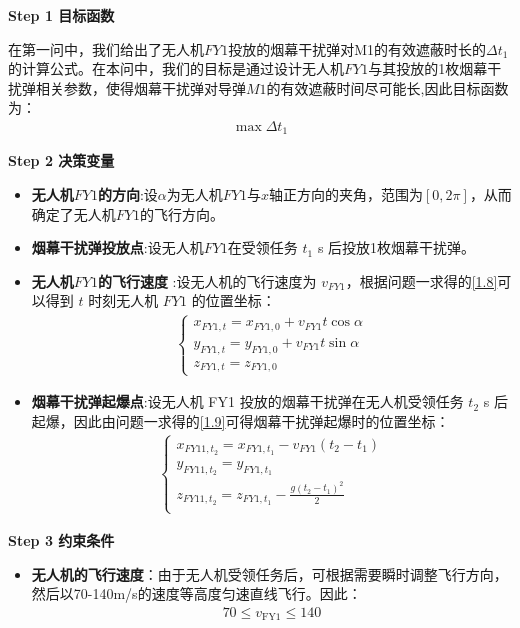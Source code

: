 \documentclass[../main.tex]{subfiles}
\begin{document}
\noindent \textbf{Step 1 目标函数}
\par 在第一问中，我们给出了无人机$FY1$投放的烟幕干扰弹对M1的有效遮蔽时长的$\Delta t_1$ 的计算公式。在本问中，我们的目标是通过设计无人机$FY1$与其投放的1枚烟幕干扰弹相关参数，使得烟幕干扰弹对导弹$M1$的有效遮蔽时间尽可能长,因此目标函数为：
\begin{align}\label{10.1}
  \max \Delta t_1
\end{align}



\noindent \textbf{Step 2 决策变量}

\begin{itemize}
\item \textbf{无人机$FY1$的方向}:设$\alpha $为无人机$FY1$与$x$轴正方向的夹角，范围为$\left[ 0,2\pi \right] $，从而确定了无人机$FY1$的飞行方向。
\item \textbf{烟幕干扰弹投放点}:设无人机$FY1$在受领任务 \( t_1 \) s 后投放1枚烟幕干扰弹。
\item  \textbf{无人机$FY1$的飞行速度} :设无人机的飞行速度为 \( v_{FY1} \)，根据问题一求得的\eqref{1.8}可以得到 \( t \) 时刻无人机 \( FY1 \) 的位置坐标：
\begin{align}\label{10.3}
  \begin{cases}
x_{FY1,t} = x_{FY1,0} + v_{FY1} t \cos\alpha \\
y_{FY1,t} = y_{FY1,0} + v_{FY1} t \sin\alpha \\
z_{FY1,t} = z_{FY1,0}
\end{cases}
\end{align}
\item \textbf{烟幕干扰弹起爆点}:设无人机 FY1 投放的烟幕干扰弹在无人机受领任务 \( t_2 \) s 后起爆，因此由问题一求得的\eqref{1.9}可得烟幕干扰弹起爆时的位置坐标：
\begin{align}\label{10.4}
    \left\{ \begin{array}{l}
	x_{FY11,t_2}=x_{FY1,t_1}-v_{FY1}\left( t_2-t_1 \right)\\
	y_{FY11,t_2}=y_{FY1,t_1}\\
	z_{FY11,t_2}=z_{FY1,t_1}-\frac{g\left( t_2-t_1 \right) ^2}{2}\\
\end{array} \right. 
\end{align}
\end{itemize}



\textbf{Step 3 约束条件}
\begin{itemize}
\item \textbf{无人机的飞行速度}：由于无人机受领任务后，可根据需要瞬时调整飞行方向，然后以70-140m/s的速度等高度匀速直线飞行。因此：
\begin{align}\label{10.8}
  70 \leq v_{\text{FY1}} \leq 140
\end{align}
\end{itemize}
\end{document}
